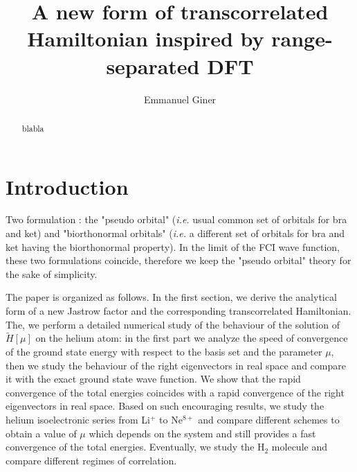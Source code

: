 \documentclass[aip,jcp,reprint,noshowkeys,superscriptaddress]{revtex4-1}
\begin{document}
	

\title{A new form of transcorrelated Hamiltonian inspired by range-separated DFT}

\author{Emmanuel Giner}

\begin{abstract}
blabla

\end{abstract}

\maketitle
\section{Introduction}
Two formulation : the "pseudo orbital" (\textit{i.e.} usual common set of orbitals for bra and ket) and "biorthonormal orbitals" (\textit{i.e.} a different set of orbitals for bra and ket having the biorthonormal property). 
In the limit of the FCI wave function, these two formulations coincide, therefore we keep the "pseudo orbital" theory for the sake of simplicity. 

The paper is organized as follows. 
In the first section, we derive the analytical form of a new Jastrow factor and the corresponding transcorrelated Hamiltonian. 
The, we perform a detailed numerical study of the behaviour of the solution of $\tilde{H}[\mu]$ on the helium atom: 
in the first part we analyze the speed of convergence of the ground state energy with respect to the basis set and the parameter $\mu$, 
then we study the behaviour of the right eigenvectors in real space and compare it with the exact ground state wave function. 
We show that the rapid convergence of the total energies coincides with a rapid convergence of the right eigenvectors in real space. 
Based on such encouraging results, we study the helium isoelectronic series from Li$^+$ to Ne$^{8+}$ and compare different schemes to obtain 
a value of $\mu$ which depends on the system and still provides a fast convergence of the total energies. 
Eventually, we study the H$_2$ molecule and compare different regimes of correlation. 
\end{document}
